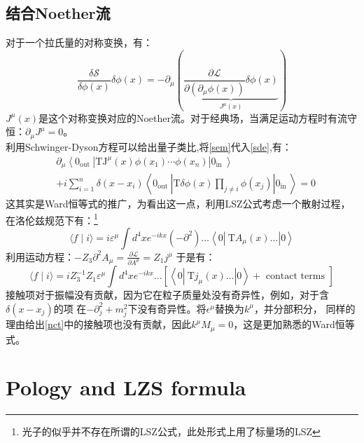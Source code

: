 \documentclass{article}
\begin{document}
\subsection{结合Noether流}
对于一个拉氏量的对称变换，有：
\begin{equation}
  \frac{\delta \mathcal{S}}{\delta \phi(x)} \delta \phi(x)=-\partial_\mu(\underbrace{\frac{\partial \mathcal{L}}{\partial\left(\partial_\mu \phi(x)\right)} \delta \phi(x)}_{J^\mu(x)})
  \label{sem}
\end{equation}
$ J^\mu(x) $是这个对称变换对应的Noether流。对于经典场，当满足运动方程时有流守恒：$\partial_\mu J^\mu=0  $。\\

利用Schwinger-Dyson方程可以给出量子类比,将\eqref{sem}代入\eqref{sde},有：
\begin{equation}
  \begin{aligned}
    & \partial_\mu\left\langle 0_{\text {out }}\left|\mathrm{T} \mathrm{J}^\mu(x) \phi\left(x_1\right) \cdots \phi\left(x_n\right)\right| 0_{\text {in }}\right\rangle \\
    & +i \sum_{i=1}^n \delta\left(x-x_i\right)\left\langle 0_{\text {out }}\left|\mathrm{T} \delta \phi(x) \prod_{j \neq i} \phi\left(x_j\right)\right| 0_{\text {in }}\right\rangle=0
    \end{aligned}
    \label{nct}
\end{equation}
这其实是Ward恒等式的推广，为看出这一点，利用LSZ公式考虑一个散射过程，在洛伦兹规范下有：\footnote{光子的似乎并不存在所谓的LSZ公式，此处形式上用了标量场的LSZ}
\begin{equation}
  \langle f \mid i\rangle=i \varepsilon^\mu \int d^4 x e^{-i k x}\left(-\partial^2\right) \ldots\left\langle 0\left|\mathrm{~T} A_\mu(x) \ldots\right| 0\right\rangle
\end{equation}
利用运动方程：$  -Z_3 \partial^2 A_\mu=\frac{\partial \mathcal{L}}{\partial A^\mu}=Z_1 j^\mu$
于是有：
\begin{equation}
  \langle f \mid i\rangle=i Z_3^{-1} Z_1 \varepsilon^\mu \int d^4 x e^{-i k x} \ldots\left[\left\langle 0\left|\mathrm{~T} j_\mu(x) \ldots\right| 0\right\rangle+\text { contact terms }\right]
\end{equation}
接触项对于振幅没有贡献，因为它在粒子质量处没有奇异性，例如，对于含$ \delta(x-x_j) $的项
在$ -\partial^2_j+m_j^2 $下没有奇异性。将$ \epsilon^\mu $替换为$ k^\mu $，并分部积分，
同样的理由给出\eqref{nct}中的接触项也没有贡献，因此$ k^\mu M_\mu=0 $，这是更加熟悉的Ward恒等式。     
\section{Pology and LZS formula}
\end{document}
